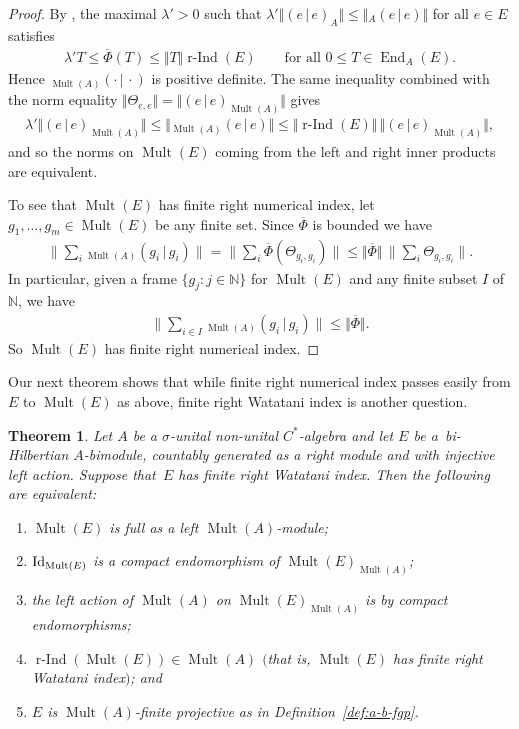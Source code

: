\documentclass[pdftex]{sigma}
\numberwithin{equation}{section}
\newtheorem{thm}{Theorem}[section]
\DeclareMathOperator{\End}{End} %
\DeclareMathOperator{\Mult}{Mult} %
\newcommand{\rInd}{\operatorname{\mbox{$r$-$\operatorname{Ind}$}}}
\newcommand{\N}{\mathbb{N}} %
\newcommand{\ol}[1]{\overline{#1}} %
\begin{document}
\begin{proof}
By \cite[Proposition 2.27(1)]{KajPinWat}, the maximal $\lambda' > 0$ such that $\lambda'\Vert (e\,|\, e)_A\Vert\leq \Vert{}_A(e\,|\, e)\Vert$ for all $e\in E$ satisf\/ies
\begin{gather*}
\lambda'T\leq \ol{\Phi}(T)\leq \Vert T\Vert \rInd(E)\qquad\text{for all $0\leq T\in \End_A(E)$.} %
\end{gather*}
Hence ${_{\Mult(A)}(\cdot \,|\, \cdot)}$ is positive def\/inite. The same inequality combined with the norm equality $\Vert \Theta_{e,e}\Vert=\Vert (e\,|\, e)_{\Mult(A)}\Vert$ gives
\begin{gather*}
\lambda'\Vert (e\,|\, e)_{\Mult(A)}\Vert \leq\Vert {}_{\Mult(A)}(e\,|\, e)\Vert \leq \Vert \rInd(E)\Vert\,\Vert (e\,|\, e)_{\Mult(A)}\Vert,
\end{gather*}
and so the norms on $\Mult(E)$ coming from the left and right inner products are equivalent.

To see that $\Mult(E)$ has f\/inite right numerical index, let $g_1, \dots, g_m \in \Mult(E)$ be any f\/inite set. Since $\overline{\Phi}$ is bounded we have
\begin{gather*}
\textstyle \big\|\sum_i {_{\Mult(A)}(g_i \,|\, g_i)}\big\| = \big\|\sum_i \overline{\Phi}(\Theta_{g_i, g_i})\big\| \le \Vert\ol{\Phi}\Vert\, \big\|\sum_i \Theta_{g_i, g_i}\big\|.
\end{gather*}
In particular, given a frame $\{g_j \colon j \in \N\}$ for $\Mult(E)$ and any f\/inite subset
$I$ of $\N$, we have
\begin{gather*}\textstyle
\big\|\sum_{i\in I} {_{\Mult(A)}(g_i \,|\, g_i)}\big\| \leq \Vert\ol{\Phi}\Vert.
\end{gather*}
So $\Mult(E)$ has f\/inite right numerical index.
\end{proof}

Our next theorem shows that while f\/inite right numerical index passes easily from $E$ to $\Mult(E)$ as above, f\/inite right Watatani index is another question.

\begin{thm}\label{thm:TFAE} Let $A$ be a $\sigma$-unital non-unital $C^*$-algebra and let $E$ be a~bi-Hilbertian $A$-bi\-module, countably generated as a right module and with injective left action. Suppose that~$E$ has finite right Watatani index. Then the following are equivalent:
\begin{enumerate}\itemsep=0pt
\item[$1)$] $\Mult(E)$ is full as a left $\Mult(A)$-module;
\item[$2)$] ${\rm Id}_{\Mult(E)}$ is a compact endomorphism of $\Mult(E)_{\Mult(A)}$;
\item[$3)$] the left action of $\Mult(A)$ on $\Mult(E)_{\Mult(A)}$ is by compact endomorphisms;
\item[$4)$] $\rInd(\Mult(E))\in\Mult(A)$ $($that is, $\Mult(E)$ has finite right Watatani index$)$; and
\item[$5)$] $E$ is $\Mult(A)$-finite projective as in Definition~{\rm \ref{def:a-b-fgp}}.
\end{enumerate}
\end{thm}
\end{document}
